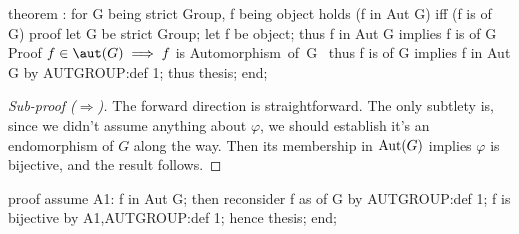 \nwenddocs{}\endmoddef\nwstartdeflinemarkup{}\nwenddeflinemarkup
theorem :
  for G being strict Group, f being object
  holds (f in Aut G) iff (f is  of G)
proof
  let G be strict Group;
  let f be object;
  thus f in Aut G implies f is  of G
  \LA{}Proof $f\in\aut(G)\implies f$ is \code{}Automorphism\ of\ G\edoc{}~{\nwtagstyle{}}\RA{}
  thus f is  of G implies f in Aut G by AUTGROUP:def 1;
  thus thesis;
end;
\eatline
{}\nwendcode{}\nwdocspar
\begin{proof}[Sub-proof ($\Longrightarrow$)]
The forward direction is
straightforward. The only subtlety is, since we didn't assume anything
about $\varphi$, we should establish it's an endomorphism of $G$ along
the way. Then its membership in $\operatorname{Aut}(G)$ implies $\varphi$ is
bijective, and the result follows.
\end{proof}

\nwenddocs{}\endmoddef\nwstartdeflinemarkup{}\nwenddeflinemarkup
proof
  assume A1: f in Aut G;
  then reconsider f as  of G by AUTGROUP:def 1;
  f is bijective by A1,AUTGROUP:def 1;
  hence thesis;
end;
\nwendcode{}\nwdocspar


